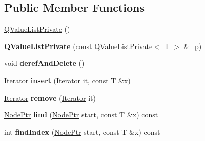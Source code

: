 \subsection*{Public Member Functions}
\begin{DoxyCompactItemize}
\item 
\mbox{\hyperlink{class_q_value_list_private_a4bc6b1cd9fef45a3d1915efcc871d908}{Q\+Value\+List\+Private}} ()
\item 
\mbox{\label{class_q_value_list_private_ad8a661568ebec3ed2f94b5c70c8400c1}} 
{\bfseries Q\+Value\+List\+Private} (const \mbox{\hyperlink{class_q_value_list_private}{Q\+Value\+List\+Private}}$<$ T $>$ \&\+\_\+p)
\item 
\mbox{\label{class_q_value_list_private_a4f5de8641a836057ec25301cd6937379}} 
void {\bfseries deref\+And\+Delete} ()
\item 
\mbox{\label{class_q_value_list_private_a17ef275bde3ca8dddb1a180d2f492990}} 
\mbox{\hyperlink{class_q_value_list_private_aef9e14569c19defeaa2b6c8e636fafde}{Iterator}} {\bfseries insert} (\mbox{\hyperlink{class_q_value_list_private_aef9e14569c19defeaa2b6c8e636fafde}{Iterator}} it, const T \&x)
\item 
\mbox{\label{class_q_value_list_private_ad8c240552b9a418f7cd604e19cbb4917}} 
\mbox{\hyperlink{class_q_value_list_private_aef9e14569c19defeaa2b6c8e636fafde}{Iterator}} {\bfseries remove} (\mbox{\hyperlink{class_q_value_list_private_aef9e14569c19defeaa2b6c8e636fafde}{Iterator}} it)
\item 
\mbox{\label{class_q_value_list_private_ab14b89cb33b215b938a60992380490f8}} 
\mbox{\hyperlink{class_q_value_list_node}{Node\+Ptr}} {\bfseries find} (\mbox{\hyperlink{class_q_value_list_node}{Node\+Ptr}} start, const T \&x) const
\item 
\mbox{\label{class_q_value_list_private_ad9c297185eb9231705865017c525b7ce}} 
int {\bfseries find\+Index} (\mbox{\hyperlink{class_q_value_list_node}{Node\+Ptr}} start, const T \&x) const
\item 
\mbox{\label{class_q_value_list_private_ab79da2939b5de307acf76c4b574fc830}} 

\end{DoxyCompactItemize}
